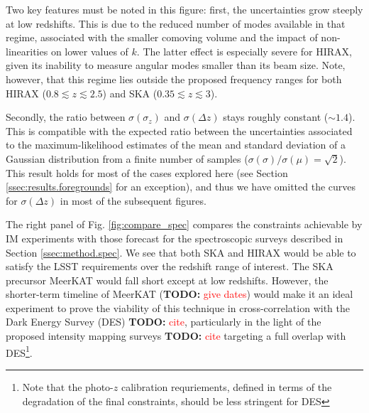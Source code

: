 \documentclass[prd,twocolumn]{revtex4}
\newcommand{\TODO}[1]{{\bf TODO:} \textcolor{red}{#1}}
\begin{document}
    Two key features must be noted in this figure: first, the uncertainties grow steeply at low
    redshifts. This is due to the reduced number of modes available in that regime, associated
    with the smaller comoving volume and the impact of non-linearities on lower values of $k$.
    The latter effect is especially severe for HIRAX, given its inability to measure angular modes
    smaller than its beam size. Note, however, that this regime lies outside the proposed frequency
    ranges for both HIRAX ($0.8\lesssim z\lesssim2.5$) and SKA ($0.35\lesssim z\lesssim3$).
    
    Secondly, the ratio between $\sigma(\sigma_z)$ and $\sigma(\Delta z)$ stays roughly constant
    ($\sim1.4$). This is compatible with the expected ratio between the uncertainties associated
    to the maximum-likelihood estimates of the mean and standard deviation of a Gaussian
    distribution from a finite number of samples ($\sigma(\sigma)/\sigma(\mu)=\sqrt{2}$).
    This result holds for most of the cases explored here (see Section
    \ref{ssec:results.foregrounds} for an exception), and thus we have omitted the curves for
    $\sigma(\Delta z)$ in most of the subsequent figures.
    
    The right panel of Fig. \ref{fig:compare_spec} compares the constraints achievable by IM
    experiments with those forecast for the spectroscopic surveys described in Section
    \ref{ssec:method.spec}. We see that both SKA and HIRAX would be able to satisfy the LSST
    requirements over the redshift range of interest. The SKA precursor MeerKAT would fall short
    except at low redshifts. However, the shorter-term timeline of MeerKAT (\TODO{give dates})
    would make it an ideal experiment to prove the viability of this technique in cross-correlation
    with the Dark Energy Survey (DES) \TODO{cite}, particularly in the light of the proposed
    intensity mapping surveys \TODO{cite} targeting a full overlap with DES\footnote{Note that the photo-$z$
    calibration requriements, defined in terms of the degradation of the final constraints, should
    be less stringent for DES}.
    
\end{document}
